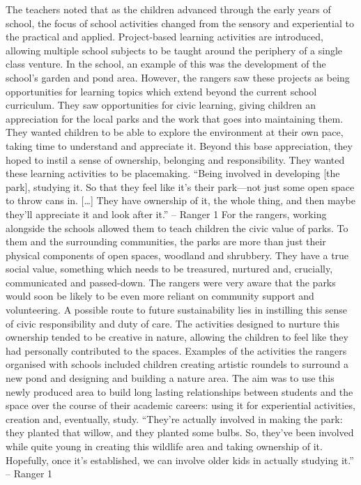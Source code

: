 The teachers noted that as the children advanced through the early years of school, the focus of school activities changed from the sensory and experiential to the practical and applied. Project-based learning activities are introduced, allowing multiple school subjects to be taught around the periphery of a single class venture. In the school, an example of this was the development of the school’s garden and pond area. However, the rangers saw these projects as being opportunities for learning topics which extend beyond the current school curriculum.  They saw opportunities for civic learning, giving children an appreciation for the local parks and the work that goes into maintaining them. They wanted children to be able to explore the environment at their own pace, taking time to understand and appreciate it. Beyond this base appreciation, they hoped to instil a sense of ownership, belonging and responsibility. They wanted these learning activities to be placemaking.
“Being involved in developing [the park], studying it. So that they feel like it’s their park—not just some open space to throw cans in. […] They have ownership of it, the whole thing, and then maybe they’ll appreciate it and look after it.” – Ranger 1
For the rangers, working alongside the schools allowed them to teach children the civic value of parks. To them and the surrounding communities, the parks are more than just their physical components of open spaces, woodland and shrubbery. They have a true social value, something which needs to be treasured, nurtured and, crucially, communicated and passed-down. The rangers were very aware that the parks would soon be likely to be even more reliant on community support and volunteering. A possible route to future sustainability lies in instilling this sense of civic responsibility and duty of care. The activities designed to nurture this ownership tended to be creative in nature, allowing the children to feel like they had personally contributed to the spaces. Examples of the activities the rangers organised with schools included children creating artistic roundels to surround a new pond and designing and building a nature area. The aim was to use this newly produced area to build long lasting relationships between students and the space over the course of their academic careers: using it for experiential activities, creation and, eventually, study. 
“They’re actually involved in making the park: they planted that willow, and they planted some bulbs. So, they’ve been involved while quite young in creating this wildlife area and taking ownership of it. Hopefully, once it’s established, we can involve older kids in actually studying it.” – Ranger 1
